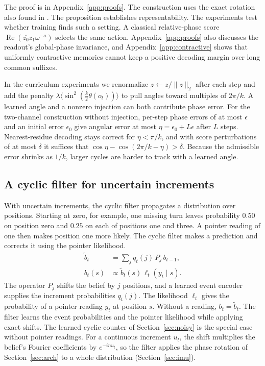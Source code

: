 The proof is in Appendix~\ref{app:proofs}. The construction uses the exact
rotation also found in \citet{grazzi2025negative,karuvally2025aussm}.
The proposition establishes representability. The experiments test whether
training finds such a setting. A classical relative-phase score
$\operatorname{Re}(\overline{z_0}z_1\omega^{-a})$ selects the same action.
Appendix~\ref{app:proofs} also discusses the readout's global-phase invariance,
and Appendix~\ref{app:contractive} shows that uniformly contractive memories
cannot keep a positive decoding margin over long common suffixes.

\label{sec:stab}
In the curriculum experiments we renormalize $z\leftarrow z/\lVert z\rVert_2$
after each step and add the penalty
$\lambda\langle\sin^2(\tfrac{k}{2}\theta(o_t))\rangle$ to pull angles toward
multiples of $2\pi/k$. A learned angle and a nonzero injection can both
contribute phase error. For the two-channel construction without
injection, per-step phase errors of at most $\epsilon$ and an initial error $\epsilon_0$
give angular error at most $\eta=\epsilon_0+L\epsilon$ after $L$ steps. Nearest-residue
decoding stays correct for $\eta<\pi/k$, and with score perturbations of at most
$\delta$ it suffices that $\cos\eta-\cos(2\pi/k-\eta)>\delta$. Because the admissible error shrinks as $1/k$,
larger cycles are harder to track with a learned angle.

\subsection{A cyclic filter for uncertain increments}
\label{sec:filter}
With uncertain increments, the cyclic filter propagates a distribution over
positions. Starting at zero, for example, one missing turn leaves probability
$0.50$ on position zero and $0.25$ on each of positions one and three. A pointer
reading of one then makes position one more likely. The cyclic filter makes a
prediction and corrects it using the pointer likelihood.
\begin{align}
\tilde b_t &= \sum_j q_t(j)\, P_j\, b_{t-1},\label{eq:filter-predict}\\
b_t(s) &\propto \tilde b_t(s)\, \ell_t(y_t\mid s).\label{eq:filter-correct}
\end{align}
The operator $P_j$ shifts the belief by $j$ positions, and a learned event
encoder supplies the increment probabilities $q_t(j)$. The likelihood $\ell_t$
gives the probability of a pointer reading $y_t$ at position $s$. Without a reading,
$b_t=\tilde b_t$. The filter learns the event probabilities and the pointer
likelihood while applying exact shifts. The learned cyclic counter of
Section~\ref{sec:noisy} is the special case without pointer readings. For a
continuous increment $u_t$, the shift multiplies the belief's Fourier
coefficients by $e^{-inu_t}$, so the filter applies the phase rotation of
Section~\ref{sec:arch} to a whole distribution (Section~\ref{sec:imu}).
